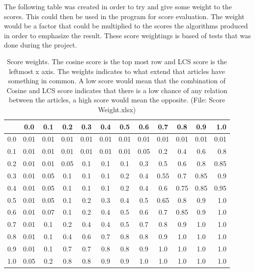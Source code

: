 The following table was created in order to try and give some weight to the scores. This could then be used in the program for score evaluation. The weight would be a factor that could be multiplied to the scores the algorithms produced in order to emphasize the result. These score weightings is based of tests that was done during the project.

\begin{table}
\begin{center}
	\begin{tabular}{l | c | c | c | c | c | c | c | c | c | c | r}
		    & 0.0 & 0.1 & 0.2 & 0.3 & 0.4 & 0.5 & 0.6 & 0.7 & 0.8 & 0.9 & 1.0\\ \hline
		0.0 & 0.01 & 0.01 & 0.01 & 0.01 & 0.01 & 0.01 & 0.01 & 0.01 & 0.01 & 0.01 & 0.01\\ \hline
		0.1 & 0.01 & 0.01 & 0.01 & 0.01 & 0.01 & 0.01 & 0.05 & 0.2 & 0.4 & 0.6 & 0.8\\ \hline
		0.2 & 0.01 & 0.01 & 0.05 & 0.1 & 0.1 & 0.1 & 0.3 & 0.5 & 0.6 & 0.8 & 0.85\\ \hline
		0.3 & 0.01 & 0.05 & 0.1 & 0.1 & 0.1 & 0.2 & 0.4 & 0.55 & 0.7 & 0.85 & 0.9\\ \hline
		0.4 & 0.01 & 0.05 & 0.1 & 0.1 & 0.1 & 0.2 & 0.4 & 0.6 & 0.75 & 0.85 & 0.95\\ \hline
		0.5 & 0.01 & 0.05 & 0.1 & 0.2 & 0.3 & 0.4 & 0.5 & 0.65 & 0.8 & 0.9 & 1.0\\ \hline
		0.6 & 0.01 & 0.07 & 0.1 & 0.2 & 0.4 & 0.5 & 0.6 & 0.7 & 0.85 & 0.9 & 1.0\\ \hline
		0.7 & 0.01 & 0.1 & 0.2 & 0.4 & 0.4 & 0.5 & 0.7 & 0.8 & 0.9 & 1.0 & 1.0\\ \hline
		0.8 & 0.01 & 0.1 & 0.4 & 0.6 & 0.7 & 0.8 & 0.8 & 0.9 & 1.0 & 1.0 & 1.0\\ \hline
		0.9 & 0.01 & 0.1 & 0.7 & 0.7 & 0.8 & 0.8 & 0.9 & 1.0 & 1.0 & 1.0 & 1.0\\ \hline
		1.0 & 0.05 & 0.2 & 0.8 & 0.8 & 0.9 & 0.9 & 1.0 & 1.0 & 1.0 & 1.0 & 1.0\\ \hline
	\end{tabular}
\end{center}
\caption{Score weights. The cosine score is the top most row and LCS score is the leftmost x axis. The weights indicates to what extend that articles have something in common. A low score would mean that the combination of Cosine and LCS score indicates that there is a low chance of any relation between the articles, a high score would mean the opposite. (File: Score Weight.xlsx)} \label{ScoreWeights}
\end{table}

